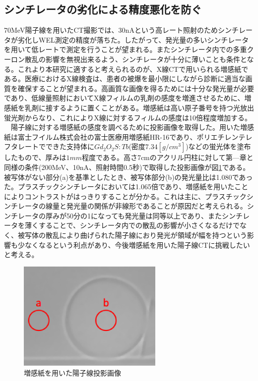 \subsection{シンチレータの劣化による精度悪化を防ぐ}
70MeV陽子線を用いたCT撮影では、30nAという高レート照射のためシンチレータが劣化しWEL測定の精度が落ちた。したがって、発光量の多いシンチレータを用いて低レートで測定を行うことが望まれる。またシンチレータ内での多重クーロン散乱の影響を無視出来るよう、シンチレータが十分に薄いことも条件となる。これより本研究に適すると考えられるのが、X線CTで用いられる増感紙である。医療におけるX線検査は、患者の被爆を最小限にしながら診断に適当な画質を確保することが望まれる。高画質な画像を得るためには十分な発光量が必要であり、低線量照射においてX線フィルムの乳剤の感度を増進させるために、増感紙を乳剤に接するように置くことがある。増感紙は高い原子番号を持つ光放出蛍光剤からなり、これによりX線に対するフィルムの感度は10倍程度増加する。\\
　陽子線に対する増感紙の感度を調べるために投影画像を取得した。用いた増感紙は富士フイルム株式会社の富士医療用増感紙HR-16であり、ポリエチレンテレフタレートでできた支持体に$Gd_{2}O_{2}S:Tb$(密度$7.34[g/cm^{3}]$)などの蛍光体を塗布したもので、厚みは$1mm$程度である。高さ7cmのアクリル円柱に対して第---章と同様の条件(200MeV、10nA、照射時間0.5秒)で取得した投影画像が図\ref{GOS}である。被写体がない部分(a)を基準としたとき、被写体部分(b)の発光量比は1.080であった。プラスチックシンチレータにおいては1.065倍であり、増感紙を用いたことによりコントラストがはっきりすることが分かる。これは主に、プラスチックシンチレータの線量と発光量の関係が非線形であることが原因だと考えられる。シンチレータの厚みが50分の1になっても発光量は同等以上であり、またシンチレータを薄くすることで、シンチレータ内での散乱の影響が小さくなるだけでなく、被写体の散乱により曲げられた陽子線におり発光が領域が幅を持つという影響も少なくなるという利点があり、今後増感紙を用いた陽子線CTに挑戦したいと考える。
\begin{figure}[H]
\centering
\includegraphics[width=7cm]{eps/NextWork/GOS.eps}
\caption{増感紙を用いた陽子線投影画像}
\label{GOS}
\end{figure}

